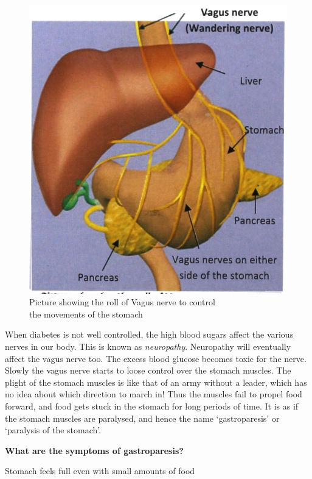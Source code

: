{\begin{figure}
\includegraphics{images/076.jpg}
\caption{Picture showing the roll of Vagus nerve to control\\ the movements of the stomach}
\end{figure}

When diabetes is not well controlled, the high blood sugars affect the various nerves in our body. This is known as \textit{neuropathy}. Neuropathy will eventually affect the vagus nerve too. The excess blood glucose becomes toxic for the nerve. Slowly the vagus nerve starts to loose control over the stomach muscles. The plight of the stomach muscles is like that of an army without a leader, which has no idea about which direction to march in! Thus the muscles fail to propel food forward, and food gets stuck in the stomach for long periods of time. It is as if the stomach muscles are paralysed, and hence the name ‘gastroparesis’ or ‘paralysis of the stomach’.

\textbf{What are the symptoms of gastroparesis?}

\item Stomach feels full even with small amounts of food

}
